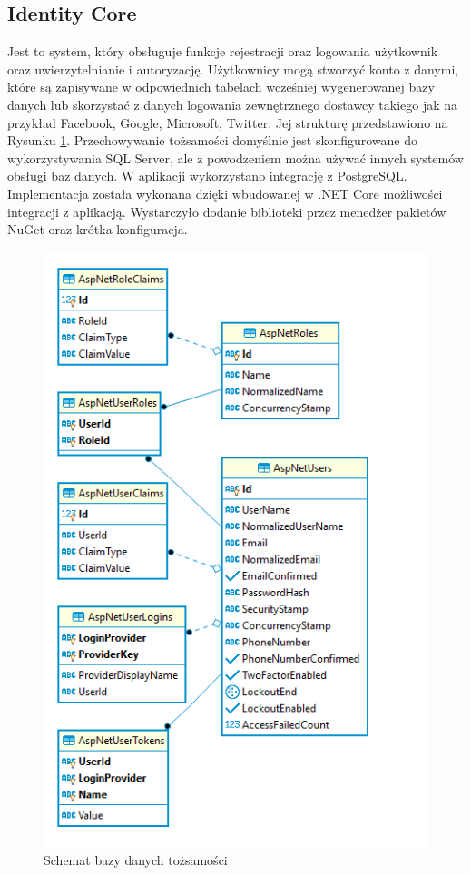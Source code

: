 \subsection{Identity Core}
Jest to system, który obsługuje funkcje rejestracji oraz logowania użytkownik oraz uwierzytelnianie i autoryzację. Użytkownicy mogą stworzyć konto z danymi, które są zapisywane w odpowiednich tabelach wcześniej wygenerowanej bazy danych lub skorzystać z danych logowania zewnętrznego dostawcy takiego jak na przykład Facebook, Google, Microsoft, Twitter. Jej strukturę przedstawiono na Rysunku \ref{fig:identity_schema}. Przechowywanie tożsamości domyślnie jest skonfigurowane do wykorzystywania SQL Server, ale z powodzeniem można używać innych systemów obsługi baz danych. W aplikacji wykorzystano integrację z PostgreSQL. Implementacja została wykonana dzięki wbudowanej w .NET Core możliwości integracji z aplikacją. Wystarczyło dodanie biblioteki przez menedżer pakietów NuGet oraz krótka konfiguracja.


\begin{figure}[H]
\includegraphics[width=.9\textwidth]{rys/identity-baza.png}
\caption{Schemat bazy danych tożsamości}
\label{fig:identity_schema}
\end{figure}

